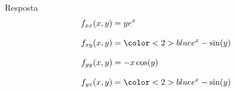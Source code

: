 \begin{resolution}{Resposta}
\begin{align*}
  f_{xx}(x, y) & = ye^x                           \\[3mm]
  f_{xy}(x, y) & = \color<2>{blue}{e^x - \sin(y)} \\[3mm]
  f_{yy}(x, y) & = -x\cos(y)                      \\[3mm]
  f_{yx}(x, y) & = \color<2>{blue}{e^x - \sin(y)}
\end{align*}
\end{resolution}

